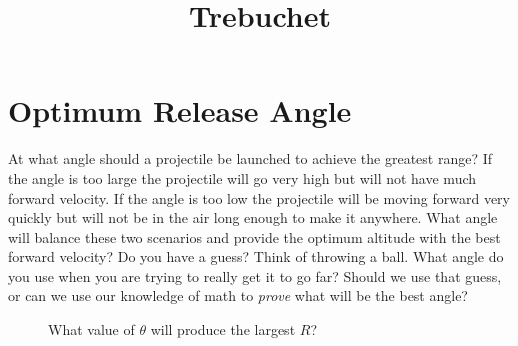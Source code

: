 \documentclass[10pt,a4paper]{article}
\begin{document}
\title{Trebuchet}
	\section{Optimum Release Angle}
		At what angle should a projectile be launched to achieve the greatest range?
		If the angle is too large the projectile will go very high but will not have much forward velocity.
		If the angle is too low the projectile will be moving forward very quickly but will not be in the air long enough to make it anywhere.
		What angle will balance these two scenarios and provide the optimum altitude with the best forward velocity?
		Do you have a guess? Think of throwing a ball. What angle do you use when you are trying to really get it to go far?
		Should we use that guess, or can we use our knowledge of math to \emph{prove} what will be the best angle?
		
		\begin{figure}
		\caption{What value of $\theta$ will produce the largest $R$?}
		\label{fig:launchAngle}
		\end{figure}
		
		
\end{document}
